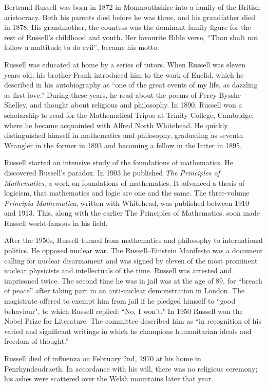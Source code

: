 \documentclass{article}
\begin{document}
Bertrand Russell was born in 1872 in Monmouthshire into a family of the British aristocracy. Both his parents died before he was three, and his grandfather died in 1878. His grandmother, the countess was the dominant family figure for the rest of Russell's childhood and youth. Her favourite Bible verse, ``Thou shalt not follow a multitude to do evil'', became his motto.

Russell was educated at home by a series of tutors. When Russell was eleven years old, his brother Frank introduced him to the work of Euclid, which he described in his autobiography as ``one of the great events of my life, as dazzling as first love.'' During these years, he read about the poems of Percy Bysshe Shelley, and thought about religious and philosophy. In 1890, Russell won a scholarship to read for the Mathematical Tripos at Trinity College, Cambridge, where he became acquainted with Alfred North Whitehead. He quickly distinguished himself in mathematics and philosophy, graduating as seventh Wrangler in the former in 1893 and becoming a fellow in the latter in 1895.

Russell started an intensive study of the foundations of mathematics. He discovered Russell's paradox. In 1903 he published {\em The Principles of Mathematics}, a work on foundations of mathematics. It advanced a thesis of logicism, that mathematics and logic are one and the same. The three-volume {\em Principia Mathematica}, written with Whitehead, was published between 1910 and 1913. This, along with the earlier The Principles of Mathematics, soon made Russell world-famous in his field.

After the 1950s, Russell turned from mathematics and philosophy to international politics. He opposed nuclear war. The Russell–Einstein Manifesto was a document calling for nuclear disarmament and was signed by eleven of the most prominent nuclear physicists and intellectuals of the time. Russell was arrested and imprisoned twice. The second time he was in jail was at the age of 89, for ``breach of peace'' after taking part in an anti-nuclear demonstration in London. The magistrate offered to exempt him from jail if he pledged himself to ``good behaviour", to which Russell replied: ``No, I won't." In 1950 Russell won the Nobel Prize for Literature. The committee described him as ``in recognition of his varied and significant writings in which he champions humanitarian ideals and freedom of thought.''

Russell died of influenza on February 2nd, 1970 at his home in Penrhyndeudraeth. In accordance with his will, there was no religious ceremony; his ashes were scattered over the Welsh mountains later that year.
\end{document}
